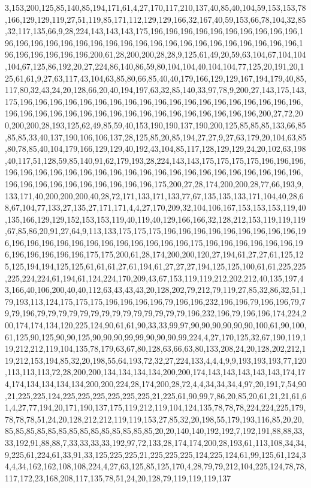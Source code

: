 3,153,200,125,85,140,85,194,171,61,4,27,170,117,210,137,40,85,40,104,59,153,153,78,166,129,129,119,27,51,119,85,171,112,129,129,166,32,167,40,59,153,66,78,104,32,85,32,117,135,66,9,28,224,143,143,143,175,196,196,196,196,196,196,196,196,196,196,196,196,196,196,196,196,196,196,196,196,196,196,196,196,196,196,196,196,196,196,196,196,196,196,196,196,200,61,28,200,200,28,28,9,125,61,49,20,59,63,104,67,104,104,104,67,125,86,192,20,27,224,86,140,86,59,80,104,104,40,104,104,77,125,20,191,20,125,61,61,9,27,63,117,43,104,63,85,80,66,85,40,40,179,166,129,129,167,194,179,40,85,117,80,32,43,24,20,128,66,20,40,194,197,63,32,85,140,33,97,78,9,200,27,143,175,143,175,196,196,196,196,196,196,196,196,196,196,196,196,196,196,196,196,196,196,196,196,196,196,196,196,196,196,196,196,196,196,196,196,196,196,196,196,200,27,72,200,200,200,28,193,125,62,49,85,59,40,153,190,190,137,190,200,125,85,85,85,133,66,85,85,85,33,40,137,190,106,106,137,28,125,85,20,85,194,27,27,9,27,63,179,20,104,63,85,80,78,85,40,104,179,166,129,129,40,192,43,104,85,117,128,129,129,24,20,102,63,198,40,117,51,128,59,85,140,91,62,179,193,28,224,143,143,175,175,175,175,196,196,196,196,196,196,196,196,196,196,196,196,196,196,196,196,196,196,196,196,196,196,196,196,196,196,196,196,196,196,196,196,196,175,200,27,28,174,200,200,28,77,66,193,9,133,171,40,200,200,200,40,28,72,171,133,171,133,77,67,135,135,133,171,104,40,28,68,67,104,77,133,27,135,27,171,171,4,4,27,170,209,32,104,106,167,153,153,153,119,40,135,166,129,129,152,153,153,119,40,119,40,129,166,166,32,128,212,153,119,119,119,67,85,86,20,91,27,64,9,113,133,175,175,175,196,196,196,196,196,196,196,196,196,196,196,196,196,196,196,196,196,196,196,196,196,196,175,196,196,196,196,196,196,196,196,196,196,196,196,175,175,200,61,28,174,200,200,120,27,194,61,27,27,61,125,125,125,194,194,125,125,61,61,61,27,61,194,61,27,27,27,194,125,125,100,61,61,225,225,225,224,224,61,194,61,124,224,170,209,43,67,153,119,119,212,202,212,40,135,197,43,166,40,106,200,40,40,112,63,43,43,43,20,128,202,79,212,79,119,27,85,32,86,32,51,179,193,113,124,175,175,175,196,196,196,196,79,196,196,232,196,196,79,196,196,79,79,79,196,79,79,79,79,79,79,79,79,79,79,79,79,79,79,196,232,196,79,196,196,174,224,200,174,174,134,120,225,124,90,61,61,90,33,33,99,97,90,90,90,90,90,90,100,61,90,100,61,125,90,125,90,90,125,90,90,90,99,99,90,90,90,99,224,4,27,170,125,32,67,190,119,119,212,212,119,104,135,78,179,63,67,80,128,63,66,63,80,133,208,24,20,128,202,212,119,212,153,194,85,32,20,198,55,64,193,72,32,27,224,133,4,4,4,9,9,193,193,193,77,120,113,113,113,72,28,200,200,134,134,134,134,200,200,174,143,143,143,143,143,174,174,174,134,134,134,134,200,200,224,28,174,200,28,72,4,4,34,34,34,4,97,20,191,7,54,90,21,225,225,124,225,225,225,225,225,225,21,225,61,90,99,7,86,20,85,20,61,21,21,61,61,4,27,77,194,20,171,190,137,175,119,212,119,104,124,135,78,78,78,224,224,225,179,78,78,78,51,24,20,128,212,212,119,119,153,27,85,32,20,198,55,179,193,116,85,20,20,85,85,85,85,85,85,85,85,85,85,85,85,85,85,20,20,140,140,192,192,7,192,191,88,88,33,33,192,91,88,88,7,33,33,33,33,192,97,72,133,28,174,174,200,28,193,61,113,108,34,34,9,225,61,224,61,33,91,33,125,225,225,21,225,225,225,124,225,124,61,99,125,61,124,34,4,34,162,162,108,108,224,4,27,63,125,85,125,170,4,28,79,79,212,104,225,124,78,78,117,172,23,168,208,117,135,78,51,24,20,128,79,119,119,119,137
